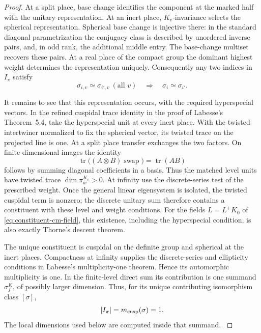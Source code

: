 \begin{proof}
At a split place, base change identifies the component at the marked half with the unitary representation. At an inert place, \(K_v\)-invariance selects the spherical representation. Spherical base change is injective there: in the standard diagonal parametrization the conjugacy class is described by unordered inverse pairs, and, in odd rank, the additional middle entry. The base-change multiset recovers these pairs. At a real place of the compact group the dominant highest weight determines the representation uniquely. Consequently any two indices in \(I_\pi\) satisfy
\[
         \sigma_{i,v}\simeq\sigma_{i',v}\ (\text{all }v)
           \quad\Longrightarrow\quad \sigma_i\simeq\sigma_{i'}.
\]

It remains to see that this representation occurs, with the required hyperspecial vectors. In the refined cuspidal trace identity in the proof of Labesse's Theorem~5.4, take the hyperspecial unit at every inert place. With the twisted intertwiner normalized to fix the spherical vector, its twisted trace on the projected line is one. At a split place transfer exchanges the two factors. On finite-dimensional images the identity
\[
 \operatorname{tr}\big((A\otimes B)\operatorname{swap}\big)=\operatorname{tr}(AB)
\]
follows by summing diagonal coefficients in a basis. Thus the matched level units have twisted trace \(\dim\pi_w^{K_v}>0\). At infinity use the discrete-series test of the prescribed weight. Once the general linear eigensystem is isolated, the twisted cuspidal term is nonzero; the discrete unitary sum therefore contains a constituent with these level and weight conditions. For the fields \(L=L^+K_0\) of \eqref{eq:constituent-cm-field}, this existence, including the hyperspecial condition, is also exactly Thorne's descent theorem. \cite[Theorem~5.4 and its proof]{labesse-cm} \cite[Theorem~4.4]{thorne-unitary-descent}

The unique constituent is cuspidal on the definite group and spherical at the inert places. Compactness at infinity supplies the discrete-series and ellipticity conditions in Labesse's multiplicity-one theorem. Hence its automorphic multiplicity is one. In the finite-level direct sum its contribution is one summand \(\sigma_f^K\), of possibly larger dimension. Thus, for its unique contributing isomorphism class \([\sigma]\),
\[
                |I_\pi|=m_{\rm cusp}(\sigma)=1 .
\] The local dimensions used below are computed inside that summand. \cite[Theorem~5.4]{labesse-cm}
\end{proof}

